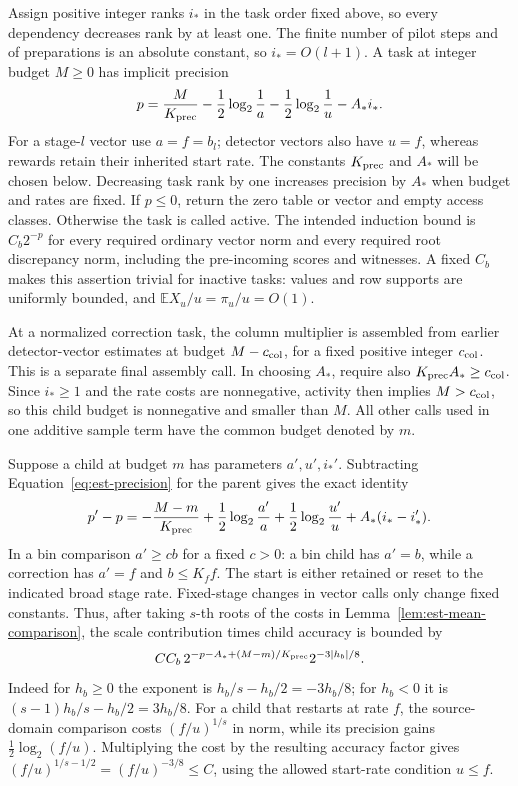 Assign positive integer ranks $i_*$ in the task order fixed above, so every
dependency decreases rank by at least one.  The finite number of pilot steps and of
preparations is an absolute constant, so $i_*=O(l+1)$.  A task at integer
budget $M\ge0$ has implicit precision
\begin{equation}
 p=\frac{M}{K_{\rm prec}}-\frac12\log_2\frac1a
        -\frac12\log_2\frac1u-A_*i_*.
 \label{eq:est-precision}
\end{equation}
For a stage-$l$ vector use $a=f=b_l$; detector vectors also have $u=f$,
whereas rewards retain their inherited start rate.  The constants
$K_{\rm prec}$ and $A_*$ will be chosen below.  Decreasing task rank by one increases precision
by $A_*$ when budget and rates are fixed.  If $p\le0$, return the zero
table or vector and empty access classes.  Otherwise the task is called
active.  The intended induction bound is $C_b2^{-p}$ for every required
ordinary vector norm and every required root discrepancy norm, including
the pre-incoming scores and witnesses.  A fixed $C_b$ makes this assertion
trivial for inactive tasks: values and row supports are uniformly bounded,
and $\mathbb E X_u/u=\pi_u/u=O(1)$.

At a normalized correction task, the column multiplier is assembled from
earlier detector-vector estimates at budget $M-c_{\rm col}$, for a fixed
positive integer $c_{\rm col}$.  This is a separate final assembly call.
In choosing $A_*$, require also $K_{\rm prec}A_*\ge c_{\rm col}$.
Since $i_*\ge1$ and the rate costs are nonnegative, activity then implies
$M>c_{\rm col}$, so this child budget is nonnegative and smaller than $M$.
All other calls used in one additive sample term have the common
budget denoted by $m$.

Suppose a child at budget $m$ has parameters $a',u',i_*'$.  Subtracting
Equation~\eqref{eq:est-precision} for the parent gives the exact identity
\begin{equation}
 p'-p=-\frac{M-m}{K_{\rm prec}}
       +\frac12\log_2\frac{a'}a
       +\frac12\log_2\frac{u'}u
       +A_*(i_*-i_*').
 \label{eq:est-child-precision}
\end{equation}
In a bin comparison $a'\ge c b$ for a fixed $c>0$: a bin child has
$a'=b$, while a correction has $a'=f$ and $b\le K_f f$.
The start is either retained or reset to the indicated broad stage rate.
Fixed-stage changes in vector calls only change fixed constants.
Thus, after taking $s$-th roots of the costs in
Lemma~\ref{lem:est-mean-comparison}, the scale contribution times child
accuracy is bounded by
\begin{equation}
 C C_b\,2^{-p-A_*+(M-m)/K_{\rm prec}}
          2^{-3|h_b|/8}.
 \label{eq:est-scale-slack}
\end{equation}
Indeed for $h_b\ge0$ the exponent is $h_b/s-h_b/2=-3h_b/8$;
for $h_b<0$ it is $(s-1)h_b/s-h_b/2=3h_b/8$.
For a child that restarts at rate $f$, the source-domain comparison costs
$(f/u)^{1/s}$ in norm, while its precision gains
$\frac12\log_2(f/u)$.  Multiplying the cost by the resulting accuracy
factor gives
$(f/u)^{1/s-1/2}=(f/u)^{-3/8}\le C$, using the allowed start-rate
condition $u\le f$.


